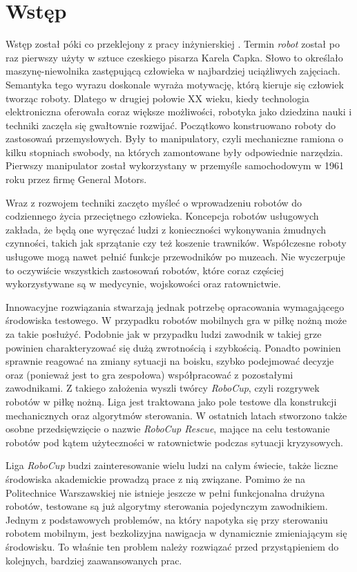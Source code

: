 \chapter[Wstęp ]{Wstęp}
Wstęp został póki co przeklejony z pracy inżynierskiej \cite{inzynierka}.
Termin \emph{robot} został po raz pierwszy użyty w sztuce czeskiego pisarza Karela \u{C}apka. Słowo to określało maszynę-niewolnika  zastępującą człowieka w najbardziej uciążliwych zajęciach. Semantyka tego wyrazu doskonale wyraża motywację, którą kieruje się człowiek tworząc roboty. Dlatego w drugiej połowie XX wieku, kiedy technologia elektroniczna oferowała coraz większe możliwości, robotyka jako dziedzina nauki i techniki zaczęła się gwałtownie rozwijać. Początkowo konstruowano roboty do zastosowań przemysłowych. Były to manipulatory, czyli mechaniczne ramiona o kilku stopniach swobody, na których zamontowane były odpowiednie narzędzia. Pierwszy manipulator został wykorzystany w przemyśle samochodowym w 1961 roku przez firmę General Motors. 

Wraz z rozwojem techniki zaczęto myśleć o wprowadzeniu robotów do codziennego życia przeciętnego człowieka. Koncepcja robotów usługowych zakłada, że będą one wyręczać ludzi z konieczności wykonywania żmudnych czynności, takich jak sprzątanie czy też koszenie trawników. Współczesne roboty usługowe mogą nawet pełnić funkcje przewodników po muzeach. Nie wyczerpuje to oczywiście wszystkich zastosowań robotów, które coraz częściej wykorzystywane są w medycynie, wojskowości oraz ratownictwie.

Innowacyjne rozwiązania stwarzają jednak potrzebę opracowania wymagającego środowiska testowego. W przypadku robotów mobilnych gra w piłkę nożną może za takie posłużyć. Podobnie jak w przypadku ludzi zawodnik w takiej grze powinien charakteryzować się dużą zwrotnością i szybkością. Ponadto powinien sprawnie reagować na zmiany sytuacji na boisku, szybko podejmować decyzje oraz (ponieważ jest to gra zespołowa) współpracować z pozostałymi zawodnikami. Z takiego założenia wyszli twórcy \emph{RoboCup}, czyli rozgrywek robotów w piłkę nożną. Liga jest traktowana jako pole testowe dla konstrukcji mechanicznych oraz algorytmów sterowania.
W ostatnich latach stworzono także osobne przedsięwzięcie o nazwie \textit{RoboCup Rescue}, mające na celu testowanie robotów pod kątem użyteczności w ratownictwie podczas sytuacji kryzysowych.

Liga \textit{RoboCup} budzi zainteresowanie wielu ludzi na całym świecie, także liczne środowiska akademickie prowadzą prace z nią związane. Pomimo że na Politechnice Warszawskiej nie istnieje jeszcze w pełni funkcjonalna drużyna robotów, testowane są już algorytmy sterowania pojedynczym zawodnikiem.
Jednym z podstawowych problemów, na który napotyka się przy sterowaniu robotem mobilnym, jest bezkolizyjna nawigacja w dynamicznie zmieniającym się środowisku. To właśnie ten problem należy rozwiązać przed przystąpieniem do kolejnych, bardziej zaawansowanych prac.

